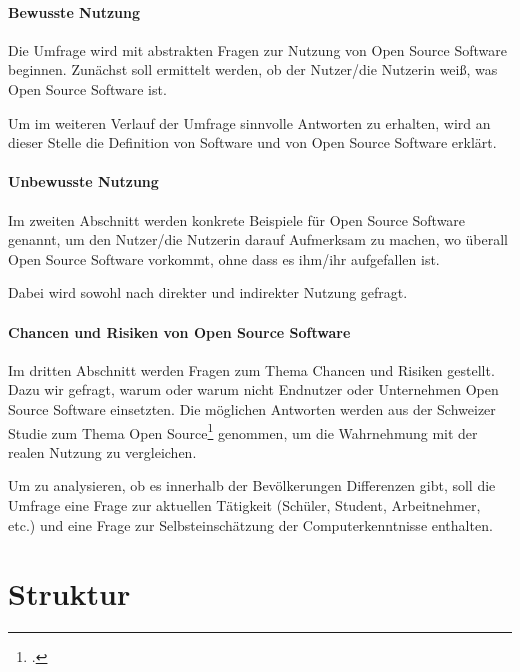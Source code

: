 \documentclass[a4paper]{article}
\begin{document}
	   \paragraph{Bewusste Nutzung}
	       Die Umfrage wird mit abstrakten Fragen zur Nutzung von Open Source Software beginnen. Zunächst soll ermittelt werden, ob der Nutzer/die Nutzerin weiß, was Open Source Software ist.
	       
	       Um im weiteren Verlauf der Umfrage sinnvolle Antworten zu erhalten, wird an dieser Stelle die Definition von Software und von Open Source Software erklärt.
	 
	   
	   \paragraph{Unbewusste Nutzung}
	       Im zweiten Abschnitt werden konkrete Beispiele für Open Source Software genannt, um den Nutzer/die Nutzerin  darauf Aufmerksam zu machen, wo überall Open Source Software vorkommt, ohne dass es ihm/ihr aufgefallen ist.
	       
	       Dabei wird sowohl nach direkter und indirekter Nutzung gefragt.
	       
	   \paragraph{Chancen und Risiken von Open Source Software}
	       Im dritten Abschnitt werden Fragen zum Thema Chancen und Risiken gestellt. Dazu wir gefragt, warum oder warum nicht Endnutzer oder Unternehmen Open Source Software einsetzten. Die möglichen Antworten werden aus der Schweizer Studie zum Thema Open Source\footcite{oss:studie} genommen, um die Wahrnehmung mit der realen Nutzung zu vergleichen.
	   \\\par
	   Um zu analysieren, ob es innerhalb der Bevölkerungen Differenzen gibt, soll die Umfrage eine Frage zur aktuellen Tätigkeit (Schüler, Student, Arbeitnehmer, etc.) und eine Frage zur Selbsteinschätzung der Computerkenntnisse enthalten.
	   
	   
	\section{Struktur}
	
    
    \clearpage
    \printbibliography
\end{document}
